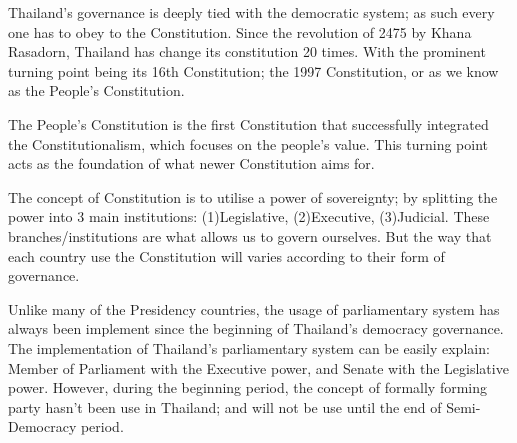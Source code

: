 \documentclass[11pt]{article}
\begin{document}
Thailand's governance is deeply tied with the democratic system; as such every one has to obey to the Constitution. Since the revolution of 2475 by Khana Rasadorn, Thailand has change its constitution 20 times. With the prominent turning point being its 16th Constitution; the 1997 Constitution, or as we know as the People's Constitution.

The People's Constitution is the first Constitution that successfully integrated the Constitutionalism, which focuses on the people's value. This turning point acts as the foundation of what newer Constitution aims for.

The concept of Constitution is to utilise a power of sovereignty; by splitting the power into 3 main institutions: (1)Legislative, (2)Executive, (3)Judicial. These branches/institutions are what allows us to govern ourselves. But the way that each country use the Constitution will varies according to their form of governance.

Unlike many of the Presidency countries, the usage of parliamentary system has always been implement since the beginning of Thailand's democracy governance. The implementation of Thailand's parliamentary system can be easily explain: Member of Parliament with the Executive power, and Senate with the Legislative power. However, during the beginning period, the concept of formally forming party hasn't been use in Thailand; and will not be use until the end of Semi-Democracy period.
\end{document}
